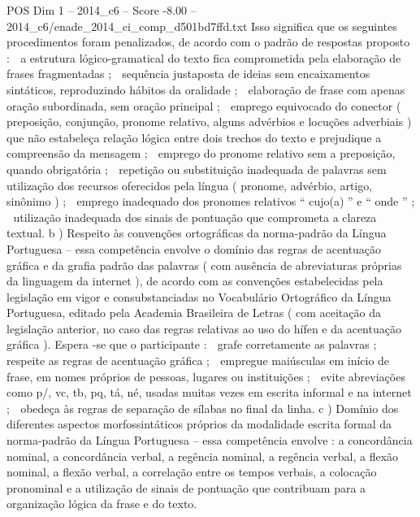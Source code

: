 \begin{textsample}{POS Dim 1 – 2014\_c6 – Score -8.00 – 2014\_c6/enade\_2014\_ci\_comp\_d501bd7ffd.txt}
Isso significa que os seguintes procedimentos foram penalizados, de acordo com o padrão de respostas proposto :  a estrutura lógico-gramatical do texto fica comprometida pela elaboração de frases fragmentadas ;  sequência justaposta de ideias sem encaixamentos sintáticos, reproduzindo hábitos da oralidade ;  elaboração de frase com apenas oração subordinada, sem oração principal ;  emprego equivocado do conector ( preposição, conjunção, pronome relativo, alguns advérbios e locuções adverbiais ) que não estabeleça relação lógica entre dois trechos do texto e prejudique a compreensão da mensagem ;  emprego do pronome relativo sem a preposição, quando obrigatória ;  repetição ou substituição inadequada de palavras sem utilização dos recursos oferecidos pela língua ( pronome, advérbio, artigo, sinônimo ) ;  emprego inadequado dos pronomes relativos “ cujo(a) ” e “ onde ” ;  utilização inadequada dos sinais de pontuação que comprometa a clareza textual. b ) Respeito às convenções ortográficas da norma-padrão da Língua Portuguesa – essa competência envolve o domínio das regras de acentuação gráfica e da grafia padrão das palavras ( com ausência de abreviaturas próprias da linguagem da internet ), de acordo com as convenções estabelecidas pela legislação em vigor e consubstanciadas no Vocabulário Ortográfico da Língua Portuguesa, editado pela Academia Brasileira de Letras ( com aceitação da legislação anterior, no caso das regras relativas ao uso do hífen e da acentuação gráfica ).
Espera -se que o participante :  grafe corretamente as palavras ;  respeite as regras de acentuação gráfica ;  empregue maiúsculas em início de frase, em nomes próprios de pessoas, lugares ou instituições ;  evite abreviações como p/, vc, tb, pq, tá, né, usadas muitas vezes em escrita informal e na internet ;  obedeça às regras de separação de sílabas no final da linha. c ) Domínio dos diferentes aspectos morfossintáticos próprios da modalidade escrita formal da norma-padrão da Língua Portuguesa – essa competência envolve : a concordância nominal, a concordância verbal, a regência nominal, a regência verbal, a flexão nominal, a flexão verbal, a correlação entre os tempos verbais, a colocação pronominal e a utilização de sinais de pontuação que contribuam para a organização lógica da frase e do texto.

\end{textsample}
